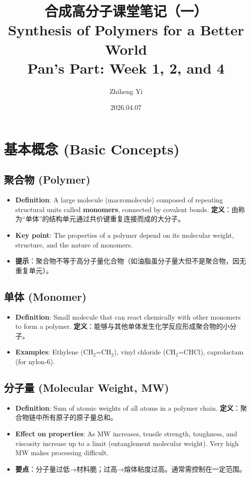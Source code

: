 \documentclass[12pt,a4paper]{ctexart}
\title{\textbf{合成高分子课堂笔记（一）}\\\large Synthesis of Polymers for a Better World \\\small Pan's Part: Week 1, 2, and 4}
\author{Zhiheng Yi}
\date{2026.04.07}
\begin{document}
\maketitle

\tableofcontents
\newpage

\section{基本概念 (Basic Concepts)}

\subsection{聚合物 (Polymer)}
\begin{itemize}
    \item \textbf{Definition}: A large molecule (macromolecule) composed of repeating structural units called \textbf{monomers}, connected by covalent bonds.  
    \textbf{定义}：由称为“单体”的结构单元通过共价键重复连接而成的大分子。
    \item \textbf{Key point}: The properties of a polymer depend on its molecular weight, structure, and the nature of monomers.
    \item \textbf{提示}：聚合物不等于高分子量化合物（如油脂虽分子量大但不是聚合物，因无重复单元）。
\end{itemize}

\subsection{单体 (Monomer)}
\begin{itemize}
    \item \textbf{Definition}: Small molecule that can react chemically with other monomers to form a polymer.  
    \textbf{定义}：能够与其他单体发生化学反应形成聚合物的小分子。
    \item \textbf{Examples}: Ethylene (CH$_2$=CH$_2$), vinyl chloride (CH$_2$=CHCl), caprolactam (for nylon-6).
\end{itemize}

\subsection{分子量 (Molecular Weight, MW)}
\begin{itemize}
    \item \textbf{Definition}: Sum of atomic weights of all atoms in a polymer chain.  
    \textbf{定义}：聚合物链中所有原子的原子量总和。
    \item \textbf{Effect on properties}: As MW increases, tensile strength, toughness, and viscosity increase up to a limit (entanglement molecular weight). Very high MW makes processing difficult.
    \item \textbf{要点}：分子量过低→材料脆；过高→熔体粘度过高。通常需控制在一定范围。
\end{itemize}
\end{document}
